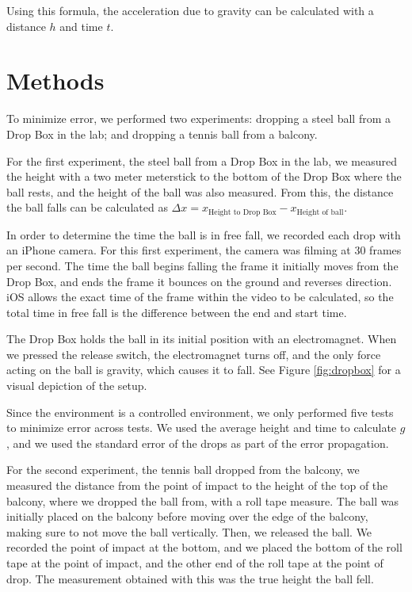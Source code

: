 \documentclass[12pt]{article}
\begin{document}
Using this formula, the acceleration due to gravity can be calculated with a distance \(h\) and time \(t\).
\section{Methods}
\label{sec:org9ff6f2c}

To minimize error, we performed two experiments: dropping a steel ball from a Drop Box in the lab; and dropping a tennis ball from a balcony.

For the first experiment, the steel ball from a Drop Box in the lab, we measured the height with a two meter meterstick to the bottom of the Drop Box where the ball rests, and the height of the ball was also measured. From this, the distance the ball falls can be calculated as \(\Delta x = x_{\text{Height to Drop Box}} - x_{\text{Height of ball}}\).

In order to determine the time the ball is in free fall, we recorded each drop with an iPhone camera. For this first experiment, the camera was filming at 30 frames per second. The time the ball begins falling the frame it initially moves from the Drop Box, and ends the frame it bounces on the ground and reverses direction. iOS allows the exact time of the frame within the video to be calculated, so the total time in free fall is the difference between the end and start time.

The Drop Box holds the ball in its initial position with an electromagnet. When we pressed the release switch, the electromagnet turns off, and the only force acting on the ball is gravity, which causes it to fall. See Figure \ref{fig:dropbox} for a visual depiction of the setup.

Since the environment is a controlled environment, we only performed five tests to minimize error across tests. We used the average height and time to calculate \(g\), and we used the standard error of the drops as part of the error propagation.

For the second experiment, the tennis ball dropped from the balcony, we measured the distance from the point of impact to the height of the top of the balcony, where we dropped the ball from, with a roll tape measure. The ball was initially placed on the balcony before moving over the edge of the balcony, making sure to not move the ball vertically. Then, we released the ball. We recorded the point of impact at the bottom, and we placed the bottom of the roll tape at the point of impact, and the other end of the roll tape at the point of drop. The measurement obtained with this was the true height the ball fell.
\end{document}
